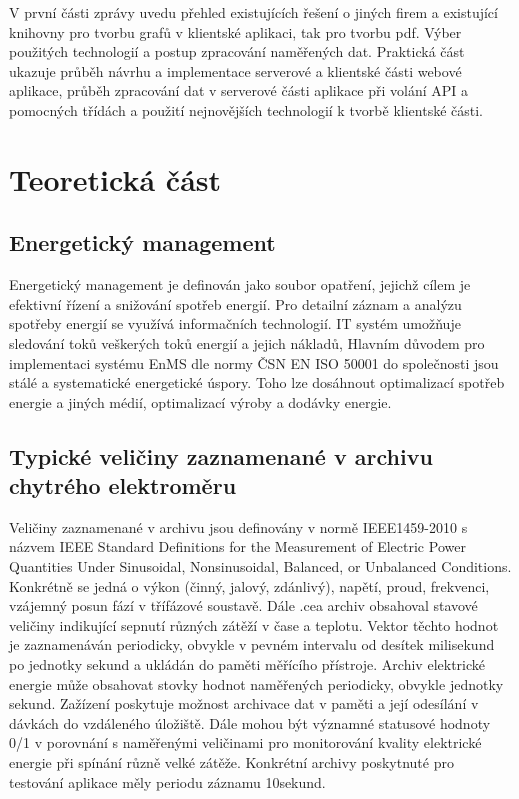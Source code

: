 \documentclass[FM,BP]{tulthesis}
\begin{document}
    V první části zprávy uvedu přehled existujících řešení o jiných firem a existující knihovny pro tvorbu grafů v klientské aplikaci, tak pro tvorbu pdf. 
    Výber použitých technologií a postup zpracování naměřených dat.
    Praktická část ukazuje průběh návrhu a implementace serverové a klientské části webové aplikace, 
    průběh zpracování dat v serverové části aplikace při volání API a pomocných třídách a použití nejnovějších technologií k tvorbě klientské části.

\chapter{Teoretická část}
    \section{Energetický management}
        Energetický management je definován jako soubor opatření, jejichž cílem je efektivní řízení a snižování spotřeb energií. \cite{30}
        Pro detailní záznam a analýzu spotřeby energií se využívá informačních technologií.
        IT systém umožňuje sledování toků veškerých toků energií a jejich nákladů, \cite{30}
        Hlavním důvodem pro implementaci systému EnMS dle normy ČSN EN ISO 50001 do společnosti jsou stálé a systematické energetické úspory.
        Toho lze dosáhnout optimalizací spotřeb energie a jiných médií, optimalizací výroby a dodávky energie.\cite{31}
    \section{Typické veličiny zaznamenané v archivu chytrého elektroměru}
        Veličiny zaznamenané v archivu jsou definovány v normě IEEE1459-2010 s názvem 
        IEEE Standard Definitions for the Measurement of Electric Power Quantities Under Sinusoidal, Nonsinusoidal, Balanced, or Unbalanced Conditions. 
        Konkrétně se jedná o výkon (činný, jalový, zdánlivý), napětí, proud, frekvenci, vzájemný posun fází v třífázové soustavě. 
        Dále .cea archiv obsahoval stavové veličiny indikující sepnutí různých zátěží v čase a teplotu. 
        Vektor těchto hodnot je zaznamenáván periodicky, obvykle v pevném intervalu od desítek milisekund 
        po jednotky sekund a ukládán do paměti měřícího přístroje. 
        Archiv elektrické energie může obsahovat stovky hodnot naměřených periodicky, obvykle jednotky sekund.
        Zažízení poskytuje možnost archivace dat v paměti a její odesílání v dávkách do vzdáleného úložiště. 
        Dále mohou být významné statusové hodnoty 0/1 v porovnání s naměřenými veličinami 
        pro monitorování kvality elektrické energie při spínání různě velké zátěže. 
        Konkrétní archivy poskytnuté pro testování aplikace měly periodu záznamu 10sekund.
\end{document}
